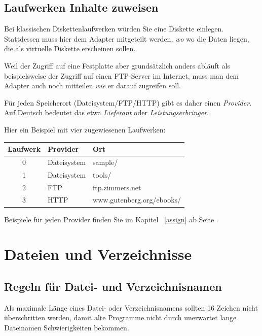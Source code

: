\documentclass[10pt,a4paper]{scrartcl}		%
\begin{document}
\subsection{Laufwerken Inhalte zuweisen}
Bei klassischen Diskettenlaufwerken würden Sie eine Diskette 
einlegen. Stattdessen muss hier dem Adapter mitgeteilt werden, 
\textit{wo} wo die Daten liegen, die als virtuelle Diskette 
erscheinen sollen.

Weil der Zugriff auf eine Festplatte aber grundsätzlich anders abläuft
als beispielsweise der Zugriff auf einen FTP-Server im Internet, 
muss man dem Adapter auch noch mitteilen \textit{wie} er darauf
zugreifen soll.

Für jeden Speicherort (Dateisystem/FTP/HTTP) gibt es daher einen 
\textit{Provider.} Auf Deutsch bedeutet das etwa \textit{Lieferant}
oder \textit{Leistungserbringer}. 

Hier ein Beispiel mit vier zugewiesenen Laufwerken:

\begin{tabular}[c]{c l l}
\toprule
Laufwerk & Provider & Ort \\
\midrule
0 & Dateisystem & sample/ \\
1 & Dateisystem & tools/ \\
2 & FTP & ftp.zimmers.net \\
3 & HTTP & www.gutenberg.org/ebooks/ \\
\bottomrule
\end{tabular}

Beispiele für jeden Provider finden Sie im Kapitel \ 
\ref{assign} \glqq{}\grqq{} ab Seite
\pageref{assign}.

\clearpage
\section{Dateien und Verzeichnisse}
\subsection{Regeln für Datei- und Verzeichnisnamen}
Als maximale Länge eines Datei- oder Verzeichnisnamens sollten
16 Zeichen nicht überschritten werden, damit alte Programme nicht
durch unerwartet lange Dateinamen Schwierigkeiten bekommen.
\end{document}
